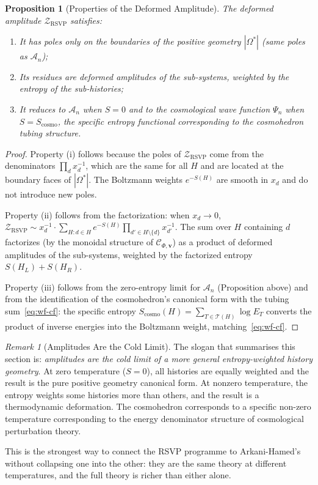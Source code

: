 \documentclass[12pt, oneside]{amsart}
\theoremstyle{plain}
\newtheorem{proposition}[theorem]{Proposition}
\theoremstyle{definition}
\theoremstyle{remark}
\newtheorem{remark}[theorem]{Remark}
\newcommand{\Sf}{S}         %
\newcommand{\OmKS}{\Omega}
\newcommand{\Amp}{\mathcal{A}}
\newcommand{\WF}{\Psi}
\newcommand{\Ccat}{\mathcal{C}_{\Phi,\mathbf{v}}}
\newcommand{\ZRSVP}{\mathcal{Z}_{\mathrm{RSVP}}}
\begin{document}
\begin{proposition}[Properties of the Deformed Amplitude]
The deformed amplitude $\ZRSVP$ satisfies:
\begin{enumerate}[label=(\roman*)]
  \item It has poles only on the boundaries of the positive geometry $|\OmKS^*|$ (same poles as $\Amp_n$);
  \item Its residues are deformed amplitudes of the sub-systems, weighted by the entropy of the sub-histories;
  \item It reduces to $\Amp_n$ when $\Sf = 0$ and to the cosmological wave function $\WF_n$ when $\Sf = \Sf_{\mathrm{cosmo}}$, the specific entropy functional corresponding to the cosmohedron tubing structure.
\end{enumerate}
\end{proposition}

\begin{proof}
Property (i) follows because the poles of $\ZRSVP$ come from the denominators $\prod_d x_d^{-1}$, which are the same for all $H$ and are located at the boundary faces of $|\OmKS^*|$. The Boltzmann weights $e^{-\Sf(H)}$ are smooth in $x_d$ and do not introduce new poles.

Property (ii) follows from the factorization: when $x_d \to 0$, $\ZRSVP \sim x_d^{-1} \cdot \sum_{H: d \in H} e^{-\Sf(H)} \prod_{d' \in H \setminus \{d\}} x_{d'}^{-1}$. The sum over $H$ containing $d$ factorizes (by the monoidal structure of $\Ccat$) as a product of deformed amplitudes of the sub-systems, weighted by the factorized entropy $\Sf(H_L) + \Sf(H_R)$.

Property (iii) follows from the zero-entropy limit for $\Amp_n$ (Proposition above) and from the identification of the cosmohedron's canonical form with the tubing sum~\eqref{eq:wf-cf}: the specific entropy $\Sf_{\mathrm{cosmo}}(H) = \sum_{T \in \mathcal{T}(H)} \log E_T$ converts the product of inverse energies into the Boltzmann weight, matching~\eqref{eq:wf-cf}.
\end{proof}

\begin{remark}[Amplitudes Are the Cold Limit]
The slogan that summarises this section is: \emph{amplitudes are the cold limit of a more general entropy-weighted history geometry}. At zero temperature ($\Sf = 0$), all histories are equally weighted and the result is the pure positive geometry canonical form. At nonzero temperature, the entropy weights some histories more than others, and the result is a thermodynamic deformation. The cosmohedron corresponds to a specific non-zero temperature corresponding to the energy denominator structure of cosmological perturbation theory.

This is the strongest way to connect the RSVP programme to Arkani-Hamed's without collapsing one into the other: they are the same theory at different temperatures, and the full theory is richer than either alone.
\end{remark}
\end{document}
